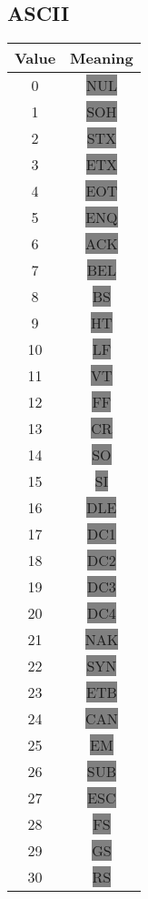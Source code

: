 \documentclass[12pt]{book}
\begin{document}
  \subsection{ASCII}

  {\ttfamily\begin{tabular}{c c}
    \hline
    Value & Meaning \\
    \hline
      0 & \colorbox{gray}{NUL} \\
      1 & \colorbox{gray}{SOH} \\
      2 & \colorbox{gray}{STX} \\
      3 & \colorbox{gray}{ETX} \\
      4 & \colorbox{gray}{EOT} \\
      5 & \colorbox{gray}{ENQ} \\
      6 & \colorbox{gray}{ACK} \\
      7 & \colorbox{gray}{BEL} \\
      8 & \colorbox{gray}{BS} \\
      9 & \colorbox{gray}{HT} \\
     10 & \colorbox{gray}{LF} \\
     11 & \colorbox{gray}{VT} \\
     12 & \colorbox{gray}{FF} \\
     13 & \colorbox{gray}{CR} \\
     14 & \colorbox{gray}{SO} \\
     15 & \colorbox{gray}{SI} \\
     16 & \colorbox{gray}{DLE} \\
     17 & \colorbox{gray}{DC1} \\
     18 & \colorbox{gray}{DC2} \\
     19 & \colorbox{gray}{DC3} \\
     20 & \colorbox{gray}{DC4} \\
     21 & \colorbox{gray}{NAK} \\
     22 & \colorbox{gray}{SYN} \\
     23 & \colorbox{gray}{ETB} \\
     24 & \colorbox{gray}{CAN} \\
     25 & \colorbox{gray}{EM} \\
     26 & \colorbox{gray}{SUB} \\
     27 & \colorbox{gray}{ESC} \\
     28 & \colorbox{gray}{FS} \\
     29 & \colorbox{gray}{GS} \\
     30 & \colorbox{gray}{RS} \\

\end{tabular}}
\end{document}
